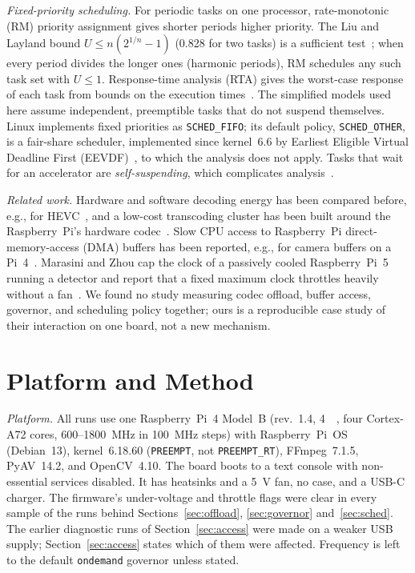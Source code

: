\documentclass[conference]{IEEEtran}
\begin{document}
\textit{Fixed-priority scheduling.} For periodic tasks on one processor, rate-monotonic (RM) priority assignment gives shorter periods higher priority. The Liu and Layland bound $U \le n(2^{1/n}-1)$ (0.828 for two tasks) is a sufficient test~\cite{liu1973}; when every period divides the longer ones (harmonic periods), RM schedules any such task set with $U \le 1$. Response-time analysis (RTA) gives the worst-case response of each task from bounds on the execution times~\cite{joseph1986,audsley1993}. The simplified models used here assume independent, preemptible tasks that do not suspend themselves. Linux implements fixed priorities as \texttt{SCHED\_FIFO}; its default policy, \texttt{SCHED\_OTHER}, is a fair-share scheduler, implemented since kernel~6.6 by Earliest Eligible Virtual Deadline First (EEVDF)~\cite{stoica1995,eevdf}, to which the analysis does not apply. Tasks that wait for an accelerator are \emph{self-suspending}, which complicates analysis~\cite{chen2019}.

\textit{Related work.} Hardware and software decoding energy has been compared before, e.g., for HEVC~\cite{khernache2021}, and a low-cost transcoding cluster has been built around the Raspberry~Pi's hardware codec~\cite{liu2018vcc}. Slow CPU access to Raspberry~Pi direct-memory-access (DMA) buffers has been reported, e.g., for camera buffers on a Pi~4~\cite{picam740}. Marasini and Zhou cap the clock of a passively cooled Raspberry~Pi~5 running a detector and report that a fixed maximum clock throttles heavily without a fan~\cite{marasini2026}. We found no study measuring codec offload, buffer access, governor, and scheduling policy together; ours is a reproducible case study of their interaction on one board, not a new mechanism.

\section{Platform and Method}
\label{sec:method}

\textit{Platform.} All runs use one Raspberry~Pi~4 Model~B (rev.~1.4, \SI{4}{\giga\byte}, four Cortex-A72 cores, 600--1800~MHz in 100~MHz steps) with Raspberry~Pi~OS (Debian~13), kernel~6.18.60 (\texttt{PREEMPT}, not \texttt{PREEMPT\_RT}), FFmpeg~7.1.5, PyAV~14.2, and OpenCV~4.10. The board boots to a text console with non-essential services disabled. It has heatsinks and a \SI{5}{\volt} fan, no case, and a USB-C charger. The firmware's under-voltage and throttle flags were clear in every sample of the runs behind Sections~\ref{sec:offload}, \ref{sec:governor} and~\ref{sec:sched}. The earlier diagnostic runs of Section~\ref{sec:access} were made on a weaker USB supply; Section~\ref{sec:access} states which of them were affected. Frequency is left to the default \texttt{ondemand} governor unless stated.
\end{document}
